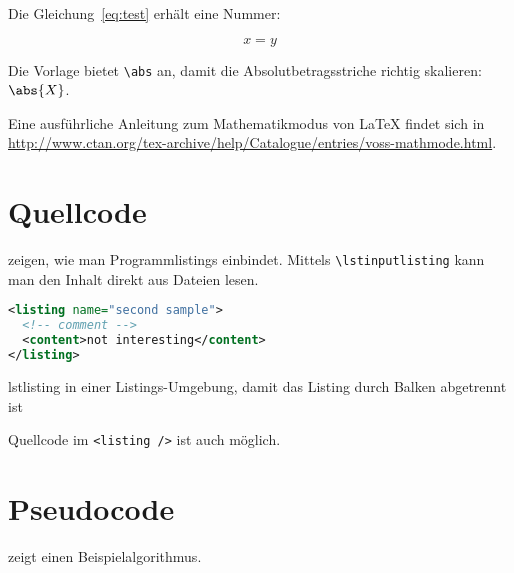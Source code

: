 
Die Gleichung~\ref{eq:test} erhält eine Nummer:
\begin{filecontents*}{\democodefile}
\begin{equation}
  \label{eq:test}
  x = y
\end{equation}
\end{filecontents*}


Die Vorlage bietet \verb+\abs+ an, damit die Absolutbetragsstriche richtig skalieren:
$\abs{X}$.

Eine ausführliche Anleitung zum Mathematikmodus von LaTeX findet sich in \url{http://www.ctan.org/tex-archive/help/Catalogue/entries/voss-mathmode.html}.

\section{Quellcode}
 zeigen, wie man Programmlistings einbindet.
Mittels \texttt{\textbackslash lstinputlisting} kann man den Inhalt direkt aus Dateien lesen.


\begin{Listing}
  \begin{lstlisting}[language=XML]
<listing name="second sample">
  <!-- comment -->
  <content>not interesting</content>
</listing>
\end{lstlisting}
  \caption{lstlisting in einer Listings-Umgebung, damit das Listing durch Balken abgetrennt ist}
  \label{lst:ListingANDlstlisting}
\end{Listing}




Quellcode im \lstinline|<listing />| ist auch möglich.


\section{Pseudocode}
 zeigt einen Beispielalgorithmus.


